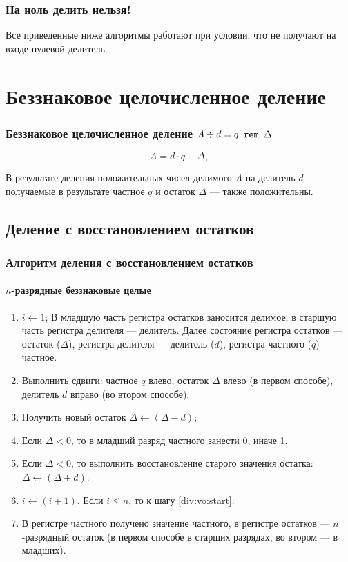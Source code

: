 \begin{frame}
    \frametitle{На ноль делить нельзя!}

    Все приведенные ниже алгоритмы работают при условии, что не получают на входе нулевой делитель.
\end{frame}


\section{Беззнаковое целочисленное деление}


\begin{frame}
    \frametitle{Беззнаковое целочисленное деление $A\div d=q\texttt{ rem } \Delta$}
    
    \[
        A = d \cdot q + \Delta,
    \]
    
    В результате деления положительных чисел делимого $A$ на делитель $d$ получаемые в результате частное $q$ и остаток $\Delta$ --- также положительны. 
\end{frame}


\subsection{Деление с восстановлением остатков}


\begin{frame}
    \frametitle{Алгоритм деления с восстановлением остатков}
    \framesubtitle{$n$-разрядные беззнаковые целые}

    \begin{enumerate}
        \item $i\gets 1$; В младшую часть регистра остатков заносится делимое, в старшую часть регистра делителя --- делитель. Далее состояние регистра остатков --- остаток ($\Delta$), регистра делителя --- делитель ($d$), регистра частного ($q$) --- частное.
        \item\label{div:vo:start} Выполнить сдвиги: частное $q$ влево, остаток $\Delta$ влево (в первом способе), делитель $d$ вправо (во втором способе).
        \item Получить новый остаток $\Delta\gets(\Delta - d)$;
        \item Если $\Delta < 0$, то в младший разряд частного занести 0, иначе 1.
        \item Если $\Delta < 0$, то выполнить восстановление старого значения остатка: $\Delta\gets(\Delta + d)$.
        \item $i\gets (i + 1)$. Если $i\le n$, то к шагу \ref{div:vo:start}.
        \item В регистре частного получено значение частного, в регистре остатков --- $n$-разрядный остаток (в первом способе в старших разрядах, во втором --- в младших).
    \end{enumerate}
\end{frame}


